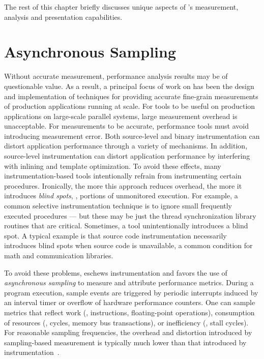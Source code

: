 \documentclass[11pt,letterpaper]{report}
\begin{document}
The rest of this chapter briefly discusses unique aspects of \HPCToolkit{}'s measurement, analysis and presentation capabilities.


\section{Asynchronous Sampling}

Without accurate measurement, performance analysis results may be of questionable value.
As a result, a principal focus of work on \HPCToolkit{} has been the design and implementation of techniques for providing accurate fine-grain measurements of production applications running at scale.
For tools to be useful on production applications on large-scale parallel systems, large measurement overhead is unacceptable.
For measurements to be accurate, performance tools must avoid introducing measurement error.
Both source-level and binary instrumentation can distort application performance through a variety of mechanisms. %
In addition, source-level instrumentation can distort application performance by interfering with inlining and template optimization.
To avoid these effects, many instrumentation-based tools intentionally refrain from instrumenting certain procedures.
Ironically, the more this approach reduces overhead, the more it introduces \emph{blind spots}, \ie{}, portions of unmonitored execution.
For example, a common selective instrumentation technique is to ignore small frequently executed procedures --- but these may be just the thread synchronization library routines that are critical.
Sometimes, a tool unintentionally introduces a blind spot.
A typical example is that source code instrumentation necessarily introduces blind spots when source code is unavailable, a common condition for math and communication libraries.

To avoid these problems, \HPCToolkit{} eschews instrumentation and favors the use of \emph{asynchronous sampling} to measure and attribute performance metrics.
During a program execution, sample events are triggered by periodic interrupts induced by an interval timer or overflow of hardware performance counters.
One can sample metrics that reflect work (\eg{}, instructions, floating-point operations), consumption of resources (\eg{}, cycles, memory bus transactions), or inefficiency (\eg{}, stall cycles).
For reasonable sampling frequencies, the overhead and distortion introduced by sampling-based measurement is typically much lower than that introduced by instrumentation~\cite{Froyd-MC-Fo:2005:ICS-csprof}.
\end{document}
